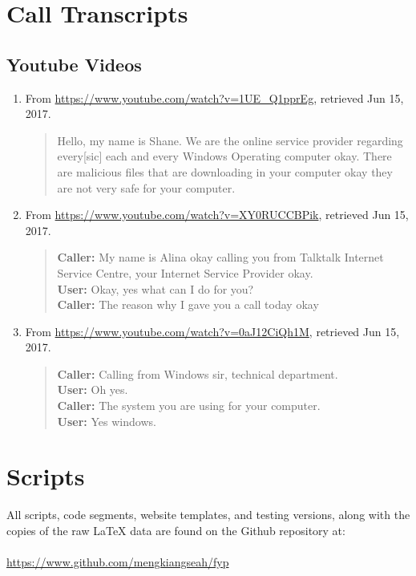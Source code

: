 \documentclass[main.tex]{subfiles}
\begin{document}
\section{Call Transcripts}\label{sec:appendix-transcripts}
\subsection{Youtube Videos}
\begin{enumerate}
	\item From \url{https://www.youtube.com/watch?v=1UE_Q1pprEg}, retrieved Jun 15, 2017.
	\begin{quote}
		Hello, my name is Shane. We are the online service provider regarding every[sic] each and every Windows Operating computer okay. There are malicious files that are downloading in your computer okay they are not very safe for your computer.
	\end{quote}

	\item From \url{https://www.youtube.com/watch?v=XY0RUCCBPik}, retrieved Jun 15, 2017.
	\begin{quote}
		\textbf{Caller:} My name is Alina okay calling you from Talktalk Internet Service Centre, your Internet Service Provider okay.\\
		\textbf{User:} Okay, yes what can I do for you?\\
		\textbf{Caller:} The reason why I gave you a call today okay
	\end{quote}

	\item From \url{https://www.youtube.com/watch?v=0aJ12CiQh1M}, retrieved Jun 15, 2017.
	\begin{quote}
		\textbf{Caller:} Calling from Windows sir, technical department.\\
		\textbf{User:} Oh yes.\\
		\textbf{Caller:} The system you are using for your computer.\\
		\textbf{User:} Yes windows.
	\end{quote}
\end{enumerate}

\section{Scripts}\label{sec:appendix-repo}
All scripts, code segments, website templates, and testing versions, along with the copies of the raw \LaTeX{} data are found on the Github repository at:
\\\\
\url{https://www.github.com/mengkiangseah/fyp}
\end{document}
